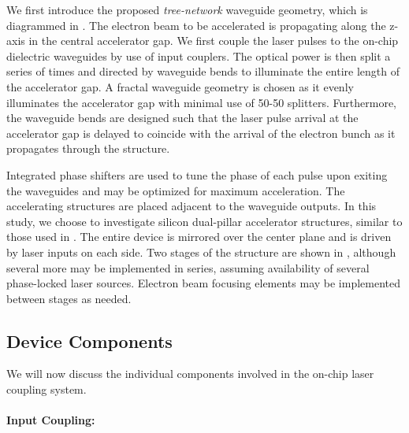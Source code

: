 
We first introduce the proposed \textit{tree-network} waveguide geometry, which is diagrammed in .
The electron beam to be accelerated is propagating along the z-axis in the central accelerator gap.
We first couple the laser pulses to the on-chip dielectric waveguides by use of input couplers.
The optical power is then split a series of times and directed by waveguide bends to illuminate the entire length of the accelerator gap.
A fractal waveguide geometry is chosen as it evenly illuminates the accelerator gap with minimal use of 50-50 splitters.
Furthermore, the waveguide bends are designed such that the laser pulse arrival at the accelerator gap is delayed to coincide with the arrival of the electron bunch as it propagates through the structure.

Integrated phase shifters are used to tune the phase of each pulse upon exiting the waveguides and may be optimized for maximum acceleration.
The accelerating structures are placed adjacent to the waveguide outputs.
In this study, we choose to investigate silicon dual-pillar accelerator structures, similar to those used in \cite{leedle2015dielectric}.
The entire device is mirrored over the center plane and is driven by laser inputs on each side.
Two stages of the structure are shown in , although several more may be implemented in series, assuming availability of several phase-locked laser sources.
Electron beam focusing elements may be implemented between stages as needed.

\subsection{Device Components}

We will now discuss the individual components involved in the on-chip laser coupling system.

\paragraph{Input Coupling:}

